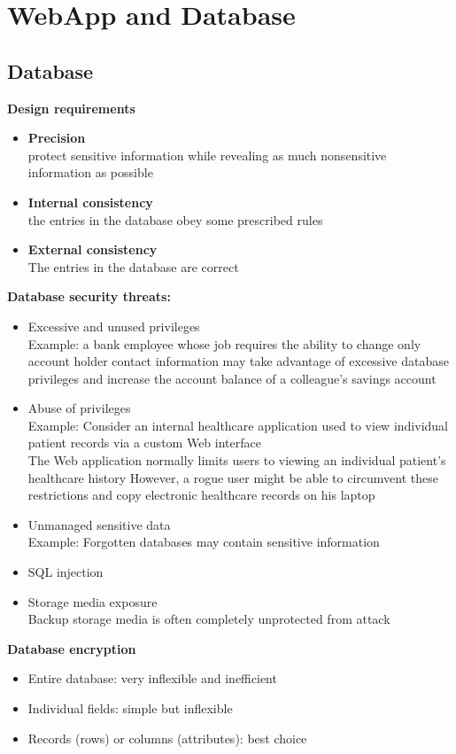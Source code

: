 \documentclass[10pt,a4paper]{book}
\begin{document}
\chapter{WebApp and Database}

\section{Database}
\textbf{Design requirements}
\begin{itemize}
\item \textbf{Precision}\\
protect sensitive information while revealing as much nonsensitive information as possible
\item \textbf{Internal consistency}\\
the entries in the database obey some prescribed rules
\item \textbf{External consistency}\\
The entries in the database are correct
\end{itemize}
\textbf{Database security threats:} 
\begin{itemize}
\item Excessive and unused privileges\\
Example: a bank employee whose job requires the ability to change only account holder contact information may take advantage of excessive database privileges and increase the account balance of a colleague's savings account 
\item Abuse of privileges\\
Example: Consider an internal healthcare application used to view individual patient records via a custom Web interface\\
The Web application normally limits users to viewing an individual patient's healthcare history 
However, a rogue user might be able to circumvent these restrictions and copy electronic healthcare
records on his laptop
\item Unmanaged sensitive data\\
Example: Forgotten databases may contain sensitive information
\item SQL injection
\item Storage media exposure\\
Backup storage media is often completely unprotected from attack
\end{itemize}
\newpage
\textbf{Database encryption}
\begin{itemize}
\item Entire database: very inflexible and inefficient
\item Individual fields: simple but inflexible
\item Records (rows) or columns (attributes): best choice
\end{itemize}
\end{document}
